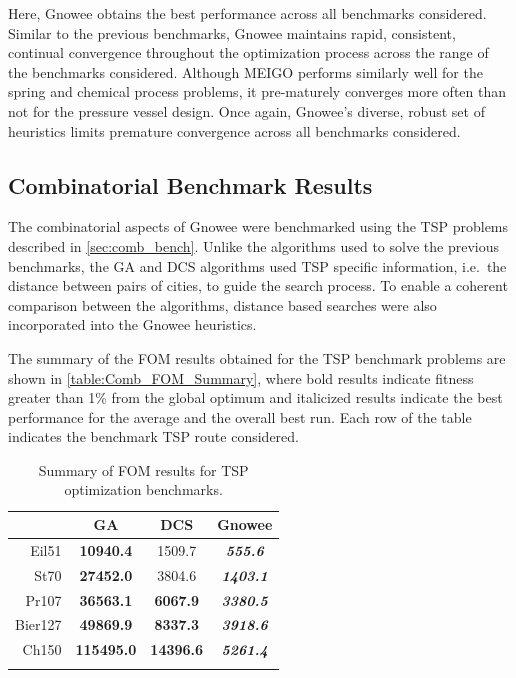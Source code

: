 \documentclass{article}                                                                           %
\begin{document}
Here, Gnowee obtains the best performance across all benchmarks considered.
Similar to the previous benchmarks, Gnowee maintains rapid, consistent, continual convergence throughout the optimization process across the range of the benchmarks considered.
Although MEIGO performs similarly well for the spring and chemical process problems, it pre-maturely converges more often than not for the pressure vessel design.
Once again, Gnowee's diverse, robust set of heuristics limits premature convergence across all benchmarks considered.

\subsection{Combinatorial Benchmark Results}

The combinatorial aspects of Gnowee were benchmarked using the TSP problems described in \autoref{sec:comb_bench}.
Unlike the algorithms used to solve the previous benchmarks, the GA and DCS algorithms used TSP specific information, i.e.\ the distance between pairs of cities, to guide the search process.
To enable a coherent comparison between the algorithms, distance based searches were also incorporated into the Gnowee heuristics.

The summary of the FOM results obtained for the TSP benchmark problems are shown in \autoref{table:Comb_FOM_Summary}, where bold results indicate fitness greater than 1\% from the global optimum and italicized results indicate the best performance for the average and the overall best run.
Each row of the table indicates the benchmark TSP route considered.  

\begin{table}[!t]
\centering
\caption{Summary of FOM results for TSP optimization benchmarks.} 
\label{table:Comb_FOM_Summary}
\begin{tabular}{r c c c} 
\toprule
\textbf{}  & \textbf{GA\cite{Mathworks2015}}  & \textbf{DCS\cite{Zhou2014}} & \textbf{Gnowee} \\
\midrule
Eil51 & \textbf{10940.4} & 1509.7 & \textit{\textbf{555.6}} \\ \addlinespace
St70 & \textbf{27452.0} & 3804.6 & \textit{\textbf{1403.1}} \\ \addlinespace
Pr107 & \textbf{36563.1} & \textbf{6067.9} & \textit{\textbf{3380.5}} \\ \addlinespace
Bier127 & \textbf{49869.9} & \textbf{8337.3} & \textit{\textbf{3918.6}} \\ \addlinespace
Ch150 & \textbf{115495.0} & \textbf{14396.6} & \textit{\textbf{5261.4}} \\ \addlinespace
\bottomrule
\end{tabular}
\end{table}
\end{document}

